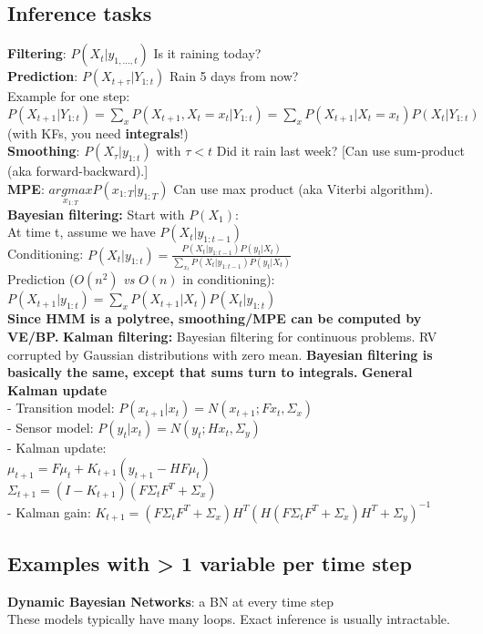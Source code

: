 \subsection{Inference tasks}
\textbf{Filtering}: $P(X_t|y_{1,...,t})$ Is it raining today?\\
\textbf{Prediction}: $P(X_{t+\tau}|Y_{1:t})$ Rain 5 days from now? \\
Example for one step:
$P(X_{t+1}|Y_{1:t})=\sum_x P(X_{t+1}, X_t=x_t|Y_{1:t})=\sum_x P(X_{t+1} | X_t=x_t)P(X_t|Y_{1:t})$ (with KFs, you need \textbf{integrals}!)\\
\textbf{Smoothing}: $P(X_\tau|y_{1:t})$ with $\tau<t$ Did it rain last week? [Can use sum-product (aka forward-backward).] \\
\textbf{MPE}:  $ \underset{x_{1:T}}{argmax}P(x_{1:T}|y_{1:T})$ Can use max product (aka Viterbi algorithm).\\
\textbf{Bayesian filtering:}
Start with $P(X_1)$:\\
At time t, assume we have $P(X_t|y_{1:t-1})$\\
Conditioning: 
$P(X_t|y_{1:t})= \frac{P(X_t|y_{1:t-1})P(y_t|X_t)}{\sum_{x_{t}} P(X_t|y_{1:t-1})P(y_t|X_t)}$\\
Prediction ($O(n^2)$ \textit{vs} $O(n)$ in conditioning):\\ 
$P(X_{t+1}|y_{1:t}) = \sum_x P(X_{t+1}|X_t)P(X_t|y_{1:t})$\\
\textbf{Since HMM is a polytree, smoothing/MPE can be computed by VE/BP.}
\textbf{Kalman filtering:} Bayesian filtering for continuous problems. RV corrupted by Gaussian distributions with zero mean. \textbf{Bayesian filtering is basically the same, except that sums turn to integrals.}
\textbf{General Kalman update}\\
- Transition model:
    $P(x_{t+1}|x_t)=N(x_{t+1};Fx_t, \Sigma_x)$\\
- Sensor model:
    $P(y_{t}|x_t)=N(y_{t};Hx_t, \Sigma_y)$\\
- Kalman update:\\
    $\mu_{t+1}=F\mu_t+K_{t+1}(y_{t+1}-HF\mu_t)$\\
    $\Sigma_{t+1}=(I-K_{t+1})(F\Sigma_tF^T + \Sigma_x)$\\
- Kalman gain:
    $K_{t+1}=(F\Sigma_t F^T+\Sigma_x)H^T(H(F\Sigma_t F^T+\Sigma_x)H^T+ \Sigma_y)^{-1}$


\subsection{Examples with > 1 variable per time step}
\textbf{Dynamic Bayesian Networks}: a BN at every time step\\
These models typically have many loops. Exact inference is usually intractable.
